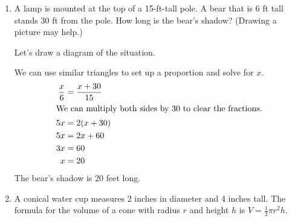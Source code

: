 \documentclass{article}
\begin{document}
\begin{enumerate}
\item 

\begin{problem}
    A lamp is mounted at the top of a 15-ft-tall pole. A bear that is 6 ft tall stands 30 ft from the pole. How long is the bear's shadow? (Drawing a picture may help.)
\end{problem}

\begin{solution}
    Let's draw a diagram of the situation.

     \begin{center}
    \end{center}
We can use similar triangles to set up a proportion and solve for $x$.
\begin{align*}
    \frac{x}{6} &= \frac{x+30}{15} \\
    \intertext{We can multiply both sides by 30 to clear the fractions.}
    5x &= 2(x+30) \\ 
    5x &= 2x+60\\
    3x &= 60 \\
    x &= 20
\end{align*}
The bear's shadow is 20 feet long.
\end{solution}

\item
\begin{problem}
    A conical water cup measures 2 inches in diameter and 4 inches tall. The formula for the volume of a cone with radius $r$ and height $h$ is $V=\frac{1}{3}\pi r^2 h$.
\end{problem}
    

\end{enumerate}
\end{document}
